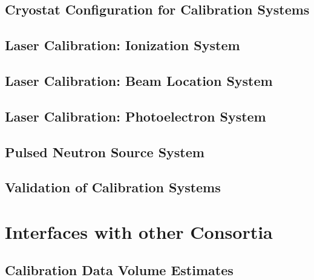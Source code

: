 \subsection{Cryostat Configuration for Calibration Systems}
\label{sec:dp-calib-cryostat}

\subsection{Laser Calibration: Ionization System}
\label{sec:dp-calib-sys-las-ion}


\subsection{Laser Calibration: Beam Location System}
\label{sec:dp-calib-sys-las-loc}


\subsection{Laser Calibration: Photoelectron System}
\label{sec:dp-calib-sys-las-pe}


\subsection{Pulsed Neutron Source System}
\label{sec:dp-calib-sys-pns}


\subsection{Validation of Calibration Systems}
\label{sec:dp-calib-val}


\section{Interfaces with other Consortia}
\label{sec:dp-calib-intfc}

\subsection{Calibration Data Volume Estimates}
\label{sec:dp-calib-daqreq}

